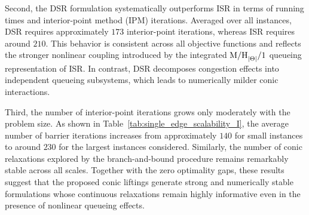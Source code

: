\documentclass[a4paper,11pt,reqno]{amsart}
\begin{document}

Second, the DSR formulation systematically outperforms ISR in terms of running times and interior-point method (IPM) iterations. Averaged over all instances, DSR requires approximately $173$ interior-point iterations, whereas ISR requires around $210$. This behavior is consistent across all objective functions and reflects the stronger nonlinear coupling introduced by the integrated ${\rm M/H}_{|\Theta|}/1$ queueing representation of ISR. In contrast, DSR decomposes congestion effects into independent queueing subsystems, which leads to numerically milder conic interactions.

Third, the number of interior-point iterations grows only moderately with the problem size. As shown in Table~\ref{tab:single_edge_scalability_I}, the average number of barrier iterations increases from approximately $140$ for small instances to around $230$ for the largest instances considered. Similarly, the number of conic relaxations explored by the branch-and-bound procedure remains remarkably stable across all scales. Together with the zero optimality gaps, these results suggest that the proposed conic liftings generate strong and numerically stable formulations whose continuous relaxations remain highly informative even in the presence of nonlinear queueing effects.
\end{document}
